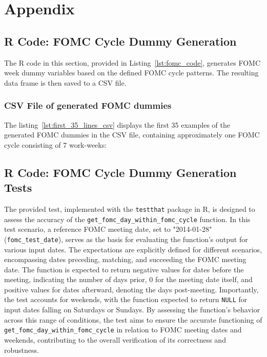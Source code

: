 \chapter{Appendix}

\section{R Code: FOMC Cycle Dummy Generation}
\label{app:fomc_code}

The R code in this section, provided in Listing~\ref{lst:fomc_code}, generates FOMC week dummy variables based on the defined FOMC cycle patterns. The resulting data frame is then saved to a CSV file.



\subsection{CSV File of generated FOMC dummies}
\label{app:first_35_lines_csv}

The listing~\ref{lst:first_35_lines_csv} displays the first 35 examples of the generated FOMC dummies in the CSV file,  containing approximately one FOMC cycle consisting of 7 work-weeks:



\section{R Code: FOMC Cycle Dummy Generation Tests}
\label{app:fomc_code}

The provided test, implemented with the \texttt{testthat} package in R, is designed to assess the accuracy of the \texttt{get\_fomc\_day\_within\_fomc\_cycle} function. In this test scenario, a reference FOMC meeting date, set to "2014-01-28" (\texttt{fomc\_test\_date}), serves as the basis for evaluating the function's output for various input dates. The expectations are explicitly defined for different scenarios, encompassing dates preceding, matching, and succeeding the FOMC meeting date. The function is expected to return negative values for dates before the meeting, indicating the number of days prior, 0 for the meeting date itself, and positive values for dates afterward, denoting the days post-meeting. Importantly, the test accounts for weekends, with the function expected to return \texttt{NULL} for input dates falling on Saturdays or Sundays. By assessing the function's behavior across this range of conditions, the test aims to ensure the accurate functioning of \texttt{get\_fomc\_day\_within\_fomc\_cycle} in relation to FOMC meeting dates and weekends, contributing to the overall verification of its correctness and robustness.


